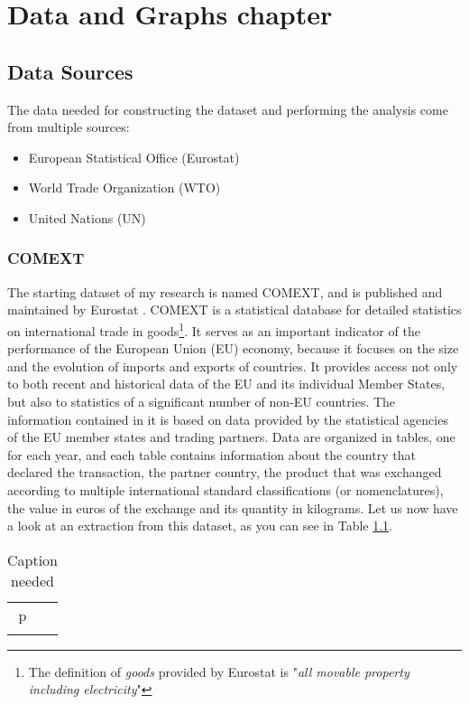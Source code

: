 \chapter{Data and Graphs chapter}

\section{Data Sources}

The data needed for constructing the dataset and performing the analysis come from multiple sources:
\begin{itemize}
    \item European Statistical Office (Eurostat) \cite{eurostat2022comext}
    \item World Trade Organization (WTO) \cite{wto2022stats}
    \item United Nations (UN) \cite{un2022population}
\end{itemize}

\subsection{COMEXT}

The starting dataset of my research is named COMEXT, and is published and maintained by Eurostat \cite{eurostat2022comext}. COMEXT is a statistical database for detailed statistics on international trade in goods\footnote{The definition of \textit{goods} provided by Eurostat is "\textit{all movable property including electricity}"}. It serves as an important indicator of the performance of the European Union (EU) economy, because it focuses on the size and the evolution of imports and exports of countries. It provides access not only to both recent and historical data of the EU and its individual Member States, but also to statistics of a significant number of non-EU countries. The information contained in it is based on data provided by the statistical agencies of the EU member states and trading partners.
Data are organized in tables, one for each year, and each table contains information about the country that declared the transaction, the partner country, the product that was exchanged according to multiple international standard classifications (or nomenclatures), the value in euros of the exchange and its quantity in kilograms.
Let us now have a look at an extraction from this dataset, as you can see in Table \ref{tab:comextexample}.


\begin{table}\label{tab:comextexample}
    \centering
    \begin{tabular}{c|c}p
         &  \\
         & 
    \end{tabular}
    \caption{Caption needed}
\end{table}

